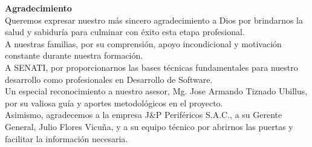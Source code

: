 {}

\vspace*{1.5cm} %

\noindent\hspace{0.42\textwidth}%
\begin{minipage}{0.53\textwidth}

{\large\bfseries Agradecimiento}\\[0.8em]

Queremos expresar nuestro más sincero agradecimiento a Dios por brindarnos la salud y sabiduría para culminar con éxito esta etapa profesional.\\[0.8em]

A nuestras familias, por su comprensión, apoyo incondicional y motivación constante durante nuestra formación.\\[0.8em]

A SENATI, por proporcionarnos las bases técnicas fundamentales para nuestro desarrollo como profesionales en Desarrollo de Software.\\[0.8em]

Un especial reconocimiento a nuestro asesor, Mg. Jose Armando Tiznado Ubillus, por su valiosa guía y aportes metodológicos en el proyecto.\\[0.8em]

Asimismo, agradecemos a la empresa J\&P Periféricos S.A.C., a su Gerente General, Julio Flores Vicuña, y a su equipo técnico por abrirnos las puertas y facilitar la información necesaria.

\end{minipage}